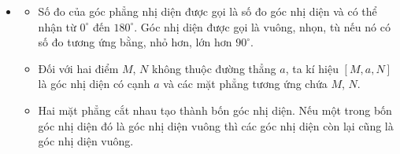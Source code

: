 \begin{itemize}
{
	}
	\item [\iconMT] 
	\begin{gachsoc}
		\begin{itemize}
		\item[\ding{172}] Số đo của góc phẳng nhị diện được gọi là số đo góc nhị diện và có thể nhận từ $0^\circ$ đến $180^\circ$. Góc nhị diện được gọi là vuông, nhọn, tù nếu nó có số đo tương ứng bằng, nhỏ hơn, lớn hơn $90^\circ$.
		\item[\ding{173}]  Đối với hai điểm $M$, $N$ không thuộc đường thẳng $a$, ta kí hiệu $[M,a,N]$ là góc nhị diện có cạnh $a$ và các mặt phẳng tương ứng chứa $M$, $N$.
		\item[\ding{174}]  Hai mặt phẳng cắt nhau tạo thành bốn góc nhị diện. Nếu một trong bốn góc nhị diện đó là góc nhị diện vuông thì các góc nhị diện còn lại cũng là góc nhị diện vuông.
	\end{itemize}
\end{gachsoc}
\end{itemize}

